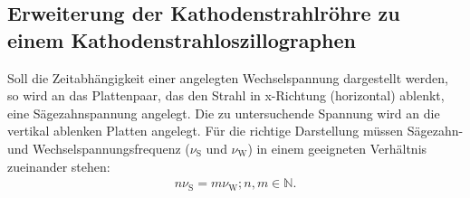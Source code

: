 \subsection{Erweiterung der Kathodenstrahlröhre zu einem
Kathodenstrahloszillographen}
Soll die Zeitabhängigkeit einer angelegten Wechselspannung dargestellt werden, so wird an das
Plattenpaar, das den Strahl in x-Richtung (horizontal) ablenkt, eine Sägezahnspannung angelegt.
Die zu untersuchende Spannung wird an die vertikal ablenken Platten angelegt.
Für die richtige Darstellung müssen Sägezahn- und Wechselspannungsfrequenz ($\nu_\text{S}$ und $\nu_\text{W}$) in einem geeigneten
Verhältnis zueinander stehen:
\begin{align}
n \nu_\text{S} = m \nu_\text{W} ; n, m \in ℕ.
\end{align}

